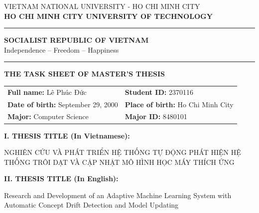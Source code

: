 \newpage
\thispagestyle{empty}

\noindent
\begin{minipage}[t]{0.56\textwidth}
    \centering
    {\fontsize{9pt}{10pt}\selectfont VIETNAM NATIONAL UNIVERSITY - HO CHI MINH CITY}\\
    {\fontsize{9pt}{10pt}\selectfont \textbf{HO CHI MINH CITY UNIVERSITY OF TECHNOLOGY}}\\
    \rule{5cm}{0.4pt}
\end{minipage}
\hfill
\begin{minipage}[t]{0.4\textwidth}
    \centering
    {\fontsize{9pt}{10pt}\selectfont  \textbf{SOCIALIST REPUBLIC OF VIETNAM}}\\
    {\fontsize{9pt}{10pt}\selectfont  Independence -- Freedom -- Happiness}\\
    \rule{5cm}{0.4pt}
\end{minipage}

\vspace{1cm}

\begin{center}
    \Large \textbf{THE TASK SHEET OF MASTER'S THESIS}
\end{center}

\vspace{0.5cm}

\fontsize{13pt}{15pt}\selectfont

\noindent

\begin{tabular}{l l}
\textbf{Full name:} Lê Phúc Đức & \textbf{Student ID:} 2370116\\
\textbf{Date of birth:} September 29, 2000 & \textbf{Place of birth:} Ho Chi Minh City\\
\textbf{Major:} Computer Science & \textbf{Major ID:} 8480101 \\
\end{tabular}

\vspace{0.7cm}

\begin{flushleft}

\noindent \textbf{I. \hspace{1mm} THESIS TITLE (In Vietnamese):}

NGHIÊN CỨU VÀ PHÁT TRIỂN HỆ THỐNG TỰ ĐỘNG PHÁT HIỆN HỆ THỐNG TRÔI DẠT VÀ CẬP NHẬT MÔ HÌNH HỌC MÁY THÍCH ỨNG

\vspace{2mm}

\noindent \textbf{II. \hspace{1mm} THESIS TITLE (In English):}

Research and Development of an Adaptive Machine Learning System with Automatic Concept Drift Detection and Model Updating

\end{flushleft}

